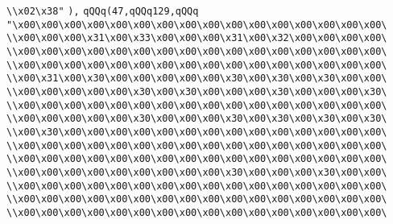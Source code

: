 \verb|\\x02\x38"|\newline
\verb|),|\newline
\verb|qQQq(47,qQQq129,qQQq|\newline
\verb|"\x00\x00\x00\x00\x00\x00\x00\x00\x00\x00\x00\x00\x00\x00\x00\x00\|\newline
\verb|\\x00\x00\x00\x31\x00\x33\x00\x00\x00\x31\x00\x32\x00\x00\x00\x00\|\newline
\verb|\\x00\x00\x00\x00\x00\x00\x00\x00\x00\x00\x00\x00\x00\x00\x00\x00\|\newline
\verb|\\x00\x00\x00\x00\x00\x00\x00\x00\x00\x00\x00\x00\x00\x00\x00\x00\|\newline
\verb|\\x00\x31\x00\x30\x00\x00\x00\x00\x00\x30\x00\x30\x00\x30\x00\x00\|\newline
\verb|\\x00\x00\x00\x00\x00\x30\x00\x30\x00\x00\x00\x30\x00\x00\x00\x30\|\newline
\verb|\\x00\x00\x00\x00\x00\x00\x00\x00\x00\x00\x00\x00\x00\x00\x00\x00\|\newline
\verb|\\x00\x00\x00\x00\x00\x30\x00\x00\x00\x30\x00\x30\x00\x30\x00\x30\|\newline
\verb|\\x00\x30\x00\x00\x00\x00\x00\x00\x00\x00\x00\x00\x00\x00\x00\x00\|\newline
\verb|\\x00\x00\x00\x00\x00\x00\x00\x00\x00\x00\x00\x00\x00\x00\x00\x00\|\newline
\verb|\\x00\x00\x00\x00\x00\x00\x00\x00\x00\x00\x00\x00\x00\x00\x00\x00\|\newline
\verb|\\x00\x00\x00\x00\x00\x00\x00\x00\x00\x30\x00\x00\x00\x30\x00\x00\|\newline
\verb|\\x00\x00\x00\x00\x00\x00\x00\x00\x00\x00\x00\x00\x00\x00\x00\x00\|\newline
\verb|\\x00\x00\x00\x00\x00\x00\x00\x00\x00\x00\x00\x00\x00\x00\x00\x00\|\newline
\verb|\\x00\x00\x00\x00\x00\x00\x00\x00\x00\x00\x00\x00\x00\x00\x00\x00\|\newline
